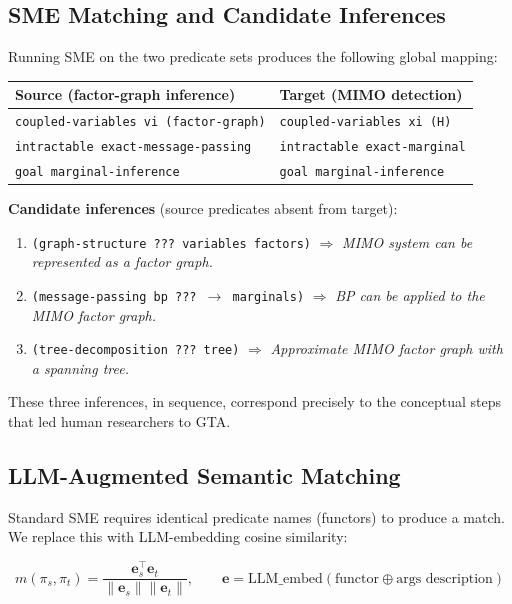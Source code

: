 \documentclass[12pt,a4paper]{article}
\begin{document}
\subsection{SME Matching and Candidate Inferences}

Running SME on the two predicate sets produces the following global mapping:

\vspace{0.3em}
\noindent
\begin{tabular}{@{}ll@{}}
  \toprule
  \textbf{Source (factor-graph inference)} & \textbf{Target (MIMO detection)} \\
  \midrule
  \texttt{coupled-variables vi (factor-graph)} & \texttt{coupled-variables xi (H)} \\
  \texttt{intractable exact-message-passing} & \texttt{intractable exact-marginal} \\
  \texttt{goal marginal-inference} & \texttt{goal marginal-inference} \\
  \bottomrule
\end{tabular}

\vspace{0.6em}
\noindent
\textbf{Candidate inferences} (source predicates absent from target):
\begin{enumerate}[itemsep=2pt]
  \item \texttt{(graph-structure ??? variables factors)}
        $\Rightarrow$ \emph{MIMO system can be represented as a factor graph.}
  \item \texttt{(message-passing bp ??? $\to$ marginals)}
        $\Rightarrow$ \emph{BP can be applied to the MIMO factor graph.}
  \item \texttt{(tree-decomposition ??? tree)}
        $\Rightarrow$ \emph{Approximate MIMO factor graph with a spanning tree.}
\end{enumerate}

These three inferences, in sequence, correspond precisely to the conceptual
steps that led human researchers to GTA.

\subsection{LLM-Augmented Semantic Matching}

Standard SME requires identical predicate names (functors) to produce a match.
We replace this with LLM-embedding cosine similarity:

\begin{equation}
  m(\pi_s, \pi_t) = \frac{\mathbf{e}_s^\top \mathbf{e}_t}{\|\mathbf{e}_s\|\|\mathbf{e}_t\|},
  \qquad \mathbf{e} = \mathrm{LLM\_embed}(\text{functor} \oplus \text{args description})
\end{equation}
\end{document}
